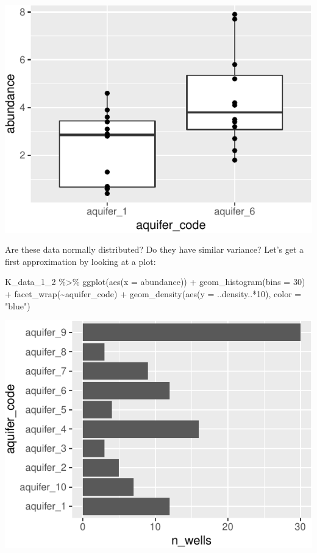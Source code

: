 \documentclass[
]{krantz}
\newenvironment{Shaded}{\begin{snugshade}}{\end{snugshade}}
\newcommand{\AttributeTok}[1]{\textcolor[rgb]{0.77,0.63,0.00}{#1}}
\newcommand{\DecValTok}[1]{\textcolor[rgb]{0.00,0.00,0.81}{#1}}
\newcommand{\FunctionTok}[1]{\textcolor[rgb]{0.00,0.00,0.00}{#1}}
\newcommand{\NormalTok}[1]{#1}
\newcommand{\SpecialCharTok}[1]{\textcolor[rgb]{0.00,0.00,0.00}{#1}}
\newcommand{\StringTok}[1]{\textcolor[rgb]{0.31,0.60,0.02}{#1}}
\begin{document}
\begin{center}\includegraphics{index_files/figure-latex/unnamed-chunk-135-1} \end{center}

Are these data normally distributed? Do they have similar variance? Let's get a first approximation by looking at a plot:

\begin{Shaded}
\begin{Highlighting}[]
\NormalTok{K\_data\_1\_2 }\SpecialCharTok{\%\textgreater{}\%}
  \FunctionTok{ggplot}\NormalTok{(}\FunctionTok{aes}\NormalTok{(}\AttributeTok{x =}\NormalTok{ abundance)) }\SpecialCharTok{+} 
    \FunctionTok{geom\_histogram}\NormalTok{(}\AttributeTok{bins =} \DecValTok{30}\NormalTok{) }\SpecialCharTok{+}
    \FunctionTok{facet\_wrap}\NormalTok{(}\SpecialCharTok{\textasciitilde{}}\NormalTok{aquifer\_code) }\SpecialCharTok{+}
    \FunctionTok{geom\_density}\NormalTok{(}\FunctionTok{aes}\NormalTok{(}\AttributeTok{y =}\NormalTok{ ..density..}\SpecialCharTok{*}\DecValTok{10}\NormalTok{), }\AttributeTok{color =} \StringTok{"blue"}\NormalTok{)}
\end{Highlighting}
\end{Shaded}

\begin{center}\includegraphics{index_files/figure-latex/unnamed-chunk-136-1} \end{center}
\end{document}
